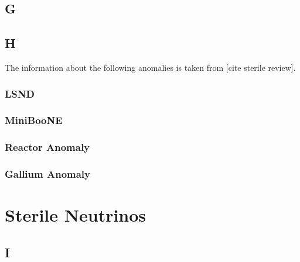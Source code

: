 \documentclass[a4paper,12pt,numbered]{article}
\begin{document}
\subsection{G}


\subsection{H}


The information about the following anomalies is taken from [cite sterile review].

\subsubsection{LSND}
\subsubsection{MiniBooNE}
\subsubsection{Reactor Anomaly}
\subsubsection{Gallium Anomaly}
\section{Sterile Neutrinos}

\subsection{I}




\end{document}
